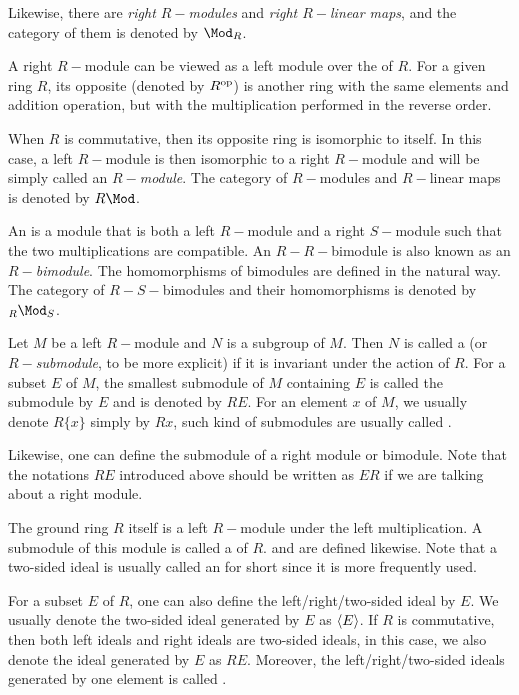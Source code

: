   Likewise, there are \emph{right $R-$modules} and \emph{right $R-$linear maps}, and the category of them is denoted by $\Mod_R$.
  \begin{rem}
    A right $R-$module can be viewed as a left module over the  of $R$. For a given ring $R$, its opposite (denoted by $R^{\operatorname{op}}$) is another ring with the same elements and addition operation, but with the multiplication performed in the reverse order.

    When $R$ is commutative, then its opposite ring is isomorphic to itself. In this case, a left $R-$module is then isomorphic to a right $R-$module and will be simply called an \emph{$R-$module}. The category of $R-$modules and $R-$linear maps is denoted by $R\Mod$.
  \end{rem}

  An  is a module that is both a left $R-$module and a right $S-$module such that the two multiplications are compatible. An $R-R-$bimodule is also known as an \emph{$R-$bimodule}. The homomorphisms of bimodules are defined in the natural way. The category of $R-S-$bimodules and their homomorphisms is denoted by $_R\Mod_S$.

  Let $M$ be a left $R-$module and $N$ is a subgroup of $M$. Then $N$ is called a  (or \emph{$R-$submodule}, to be more explicit) if it is invariant under the action of $R$. For a subset $E$ of $M$, the smallest submodule of $M$ containing $E$ is called the submodule  by $E$ and is denoted by $RE$. For an element $x$ of $M$, we usually denote $R\{x\}$ simply by $Rx$, such kind of submodules are usually called .

  Likewise, one can define the submodule of a right module or bimodule. Note that the notations $RE$ introduced above should be written as $ER$ if we are talking about a right module.

  The ground ring $R$ itself is a left $R-$module under the left multiplication. A submodule of this module is called a  of $R$.  and  are defined likewise. Note that a two-sided ideal is usually called an  for short since it is more frequently used.

  For a subset $E$ of $R$, one can also define the left/right/two-sided ideal  by $E$. We usually denote the two-sided ideal generated by $E$ as $\langle E\rangle$.
  If $R$ is commutative, then both left ideals and right ideals are two-sided ideals, in this case, we also denote the ideal generated by $E$ as $RE$.
  Moreover, the left/right/two-sided ideals generated by one element is called .

